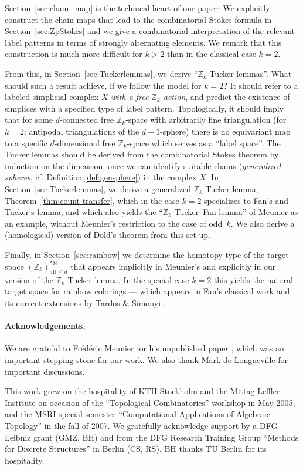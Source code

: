 \documentclass[11pt,a4paper,draft]{article}
\newcommand{\Z}{{\mathbb Z}}
\newcommand{\N}{{\mathbb N}}
\newcommand\alt{{\mathrm{alt}}}
\theoremstyle{definition}
\begin{document}
Section~\ref{sec:chain_map} is the technical heart of 
our paper: We explicitly construct the
chain maps that lead to the combinatorial Stokes formula
in Section~\ref{sec:ZpStokes} and we give a combinatorial interpretation of 
the relevant label patterns in terms of strongly alternating elements. 
We remark that this construction is much more difficult for $k >2$ than 
in the classical case $k=2$. 

From this, in Section~\ref{sec:Tuckerlemmas}, we derive
``$\Z_k$-Tucker lemmas''.
What should such a result achieve, if we follow the model for $k=2$?
It should refer to a labeled simplicial complex $X$
\emph{with a free $\Z_k$ action}, and predict the
existence of simplices with a specified type of label pattern.
Topologically, it should imply
that for some $d$-connected free $\Z_k$-space
with arbitrarily fine triangulation
(for $k=2$: antipodal triangulations of the $d+1$-sphere)
there is no equivariant map to a specific $d$-dimensional free
$\Z_k$-space which serves as a ``label space''.
The Tucker lemmas should be derived from the combinatorial Stokes theorem
by induction on the dimension, once we can identify
suitable chains ({\em generalized spheres}, cf. Definition \ref{def:gensphere}) in the complex $X$.
In Section~\ref{sec:Tuckerlemmas}, we derive a
generalized $\Z_k$-Tucker lemma, Theorem~\ref{thm:count-transfer},
which in the case $k=2$ specializes to Fan's and Tucker's lemma,
and which also yields the ``$\Z_k$-Tucker--Fan
lemma'' of Meunier \cite[Thm.~2]{meunier06:_spern}
as an example, without Meunier's
restriction to the case of odd~$k$.
We also derive a (homological) version of Dold's theorem from this set-up.

Finally, in Section~\ref{sec:rainbow} we determine the homotopy type
of the target space $(\Z_k)^{*\N}_{\alt \leq d}$ that appears implicitly in
Meunier's and explicitly in our version of the $\Z_k$-Tucker lemma. In
the special case $k=2$ this yields the natural target space for
rainbow colorings --- which appears in Fan's classical work
\cite{fan82} and its current extensions by Tardos \& Simonyi
\cite{TardosSimonyi3,TardosSimonyi1}.

\begin{small}
\paragraph{Acknowledgements.}

We are grateful to Fr\'ed\'eric Meunier for his unpublished paper
\cite{meunier:_z_fan05}, which was an important stepping-stone for our
work. We also thank Mark de Longueville for important discussions.

This work grew on the hospitality of KTH Stockholm and the
Mittag-Leffler Institute on occasion of the
``Topological Combinatorics'' workshop in May 2005, and the
MSRI special semester ``Computational Applications of Algebraic
Topology'' in the fall of 2007. We gratefully acknowledge support
by a DFG Leibniz grant (GMZ, BH) and from the
DFG Research Training Group ``Methods for Discrete Structures'' in
Berlin (CS, RS). BH thanks TU Berlin for its hospitality.

\end{small}
\end{document}

